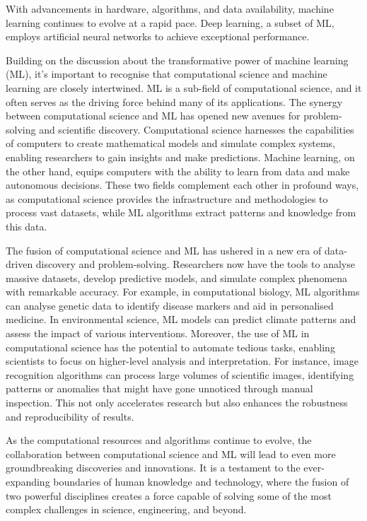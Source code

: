 With advancements in hardware, algorithms, and data availability, machine learning continues to evolve at a rapid pace. Deep learning, a subset of ML, employs artificial neural networks to achieve exceptional performance. 

Building on the discussion about the transformative power of machine learning (ML), it's important to recognise that computational science and machine learning are closely intertwined. ML is a sub-field of computational science, and it often serves as the driving force behind many of its applications. The synergy between computational science and ML has opened new avenues for problem-solving and scientific discovery.
Computational science harnesses the capabilities of computers to create mathematical models and simulate complex systems, enabling researchers to gain insights and make predictions. Machine learning, on the other hand, equips computers with the ability to learn from data and make autonomous decisions. These two fields complement each other in profound ways, as computational science provides the infrastructure and methodologies to process vast datasets, while ML algorithms extract patterns and knowledge from this data.

The fusion of computational science and ML has ushered in a new era of data-driven discovery and problem-solving. Researchers now have the tools to analyse massive datasets, develop predictive models, and simulate complex phenomena with remarkable accuracy. For example, in computational biology, ML algorithms can analyse genetic data to identify disease markers and aid in personalised medicine. In environmental science, ML models can predict climate patterns and assess the impact of various interventions.
Moreover, the use of ML in computational science has the potential to automate tedious tasks, enabling scientists to focus on higher-level analysis and interpretation. For instance, image recognition algorithms can process large volumes of scientific images, identifying patterns or anomalies that might have gone unnoticed through manual inspection. This not only accelerates research but also enhances the robustness and reproducibility of results.

As the computational resources and algorithms continue to evolve, the collaboration between computational science and ML will lead to even more groundbreaking discoveries and innovations. It is a testament to the ever-expanding boundaries of human knowledge and technology, where the fusion of two powerful disciplines creates a force capable of solving some of the most complex challenges in science, engineering, and beyond.
